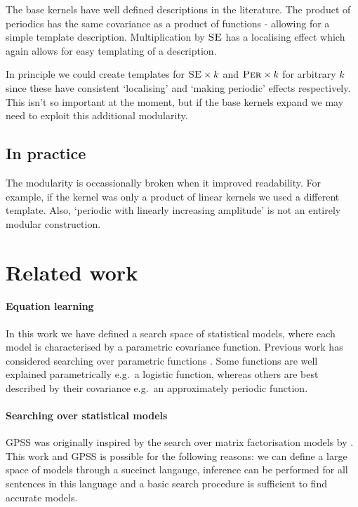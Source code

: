 \documentclass{article}
\def\eg{e.g.\ }
\begin{document}
The base kernels have well defined descriptions in the literature.
The product of periodics has the same covariance as a product of functions - allowing for a simple template description.
Multiplication by ${\textsc{SE}}$ has a localising effect which again allows for easy templating of a description.

In principle we could create templates for $\textsc{SE} \times k$ and $\textsc{Per} \times k$ for arbitrary $k$ since these have consistent `localising' and `making periodic' effects respectively.
This isn't so important at the moment, but if the base kernels expand we may need to exploit this additional modularity.

\subsection{In practice}

The modularity is occassionally broken when it improved readability.
For example, if the kernel was only a product of linear kernels we used a different template.
Also, `periodic with linearly increasing amplitude' is not an entirely modular construction.

\section{Related work}

\paragraph{Equation learning}

In this work we have defined a search space of statistical models, where each model is characterised by a parametric covariance function.
Previous work has considered searching over parametric functions \citep[e.g.][]{Schmidt2009b}.
Some functions are well explained parametrically \eg a logistic function, whereas others are best described by their covariance \eg an approximately periodic function.

\paragraph{Searching over statistical models}

GPSS was originally inspired by the search over matrix factorisation models by \cite{grosse2012exploiting}.
This work and GPSS is possible for the following reasons: we can define a large space of models through a succinct langauge, inference can be performed for all sentences in this language and a basic search procedure is sufficient to find accurate models.
\end{document}
